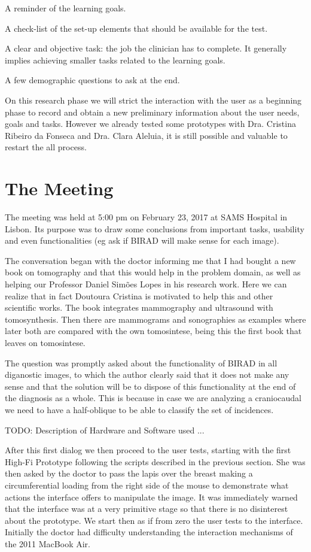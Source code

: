  A reminder of the learning goals.

 A check-list of the set-up elements that should be available for the test.

 A clear and objective task: the job the clinician has to complete. It generally implies achieving smaller tasks related to the learning goals.

 A few demographic questions to ask at the end.

On this research phase we will strict the interaction with the user as a beginning phase to record and obtain a new preliminary information about the user needs, goals and tasks. However we already tested some prototypes with Dra. Cristina Ribeiro da Fonseca and Dra. Clara Aleluia, it is still possible and valuable to restart the all process.

\clearpage

\section{The Meeting}

The meeting was held at 5:00 pm on February 23, 2017 at SAMS Hospital in Lisbon. Its purpose was to draw some conclusions from important tasks, usability and even functionalities (eg ask if BIRAD will make sense for each image).

The conversation began with the doctor informing me that I had bought a new book on tomography and that this would help in the problem domain, as well as helping our Professor Daniel Simões Lopes in his research work. Here we can realize that in fact Doutoura Cristina is motivated to help this and other scientific works. The book integrates mammography and ultrasound with tomosynthesis. Then there are mammograms and sonographies as examples where later both are compared with the own tomosintese, being this the first book that leaves on tomosintese.

The question was promptly asked about the functionality of BIRAD in all diganostic images, to which the author clearly said that it does not make any sense and that the solution will be to dispose of this functionality at the end of the diagnosis as a whole. This is because in case we are analyzing a craniocaudal we need to have a half-oblique to be able to classify the set of incidences.

TODO: Description of Hardware and Software used ...

After this first dialog we then proceed to the user tests, starting with the first High-Fi Prototype following the scripts described in the previous section. She was then asked by the doctor to pass the lapis over the breast making a circumferential loading from the right side of the mouse to demonstrate what actions the interface offers to manipulate the image. It was immediately warned that the interface was at a very primitive stage so that there is no disinterest about the prototype. We start then as if from zero the user tests to the interface. Initially the doctor had difficulty understanding the interaction mechanisms of the 2011 MacBook Air.

